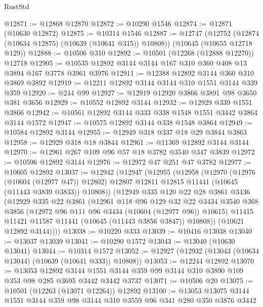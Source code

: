 \begin{lexlean}{RustStd}
\begin{coremodule}
@12871 := @12868 @12870
@12872 := @10290 @1546
@12874 := @12871 (@10630 @12872)
@12875 := @10314 @1546
@12887 := @12747
    (@12752 (@12874 (@10634 @12875) (@10639 (@10641 @315)) @10808))
    (@10645 (@10655 @12718 @129))
@12888 := @10506 @310
@12892 := @10501 (@12268 (@12888 @12270)) @12718
@12905 := @10535 @12892 @3144 @3144 @167 @310 @360 @408 @13 @3894 @167 @3778 @3961 @3976
@12911 := @12388 @12892 @3144 @360 @310 @3869 @3892
@12919 := @12211 @12892 @3144 @3144 @310 @1551 @3144 @339 @359
@12920 := @244 @99
@12927 := @12919 @12920 @3866 @3891 @98 @3650 @381 @3656
@12929 := @10552 @12892 @3144
@12932 := @12929 @339 @1551 @3866
@12942 := @10561 @12892 @3144 @333 @338 @1548 @1551 @3442 @3864 @3144 @1572
@12947 := @10575 @12892 @3144 @338 @1548 @3864
@12949 := @10584 @12892 @3144
@12955 := @12949 @318 @337 @18 @29 @3844 @3863
@12958 := @12929 @318 @18 @3844
@12961 := @11369 @12892 @3144 @3144
@12970 := @12961 @267 @109 @96 @57 @18 @3782 @3540 @347 @3839
@12972 := @10596 @12892 @3144
@12976 := @12972 @47 @251 @47 @3782
@12977 := @10605 @12892
@13037 := @12942
    (@12947
      (@12955
        (@12958
          (@12970
            (@12976 (@10604 (@12977 @47)) @12802)
            @12807
            @12811
            @12815
            @11441
            (@10645 (@11443 @3839 @3833))
            @10808))
        (@12949
          @335
          @120
          @22
          @28
          @3861
          @3436
          (@12929
            @335
            @22
            @3861
            (@12961
              @118
              @96
              @129
              @32
              @22
              @3434
              @3540
              @368
              @3856
              (@12972 @96 @111 @96 @3434 (@10604 (@12977 @96)) @10615)
              @11415
              @11421
              @11587
              @11441
              (@10645 (@11443 @3856 @3847))
              @10808))
          (@10621 @12892 @3144))))
@13038 := @10220 @333
@13039 := @10416 @13038
@13040 := @13037 @13039
@13041 := @10290 @1572
@13043 := @13040 (@10630 @13041)
@13044 := @10314 @1572
@13052 := @12927 (@12932 (@13043 (@10634 @13044) (@10639 (@10641 @333)) @10808))
@13053 := @12244 @12892
@13070 := @13053
    @12892
    @3144
    @1551
    @3144
    @359
    @99
    @3144
    @310
    @3890
    @109
    @353
    @98
    @285
    @3695
    @3442
    @3442
    @3737
@13071 := @10506 @20
@13075 := @10501 (@12263 (@13071 @12264)) @12892
@13100 := @13053
    @13075
    @3144
    @1551
    @3144
    @359
    @98
    @3144
    @310
    @3559
    @96
    @341
    @280
    @350
    @3876
    @3442

\end{coremodule}
\end{lexlean}
